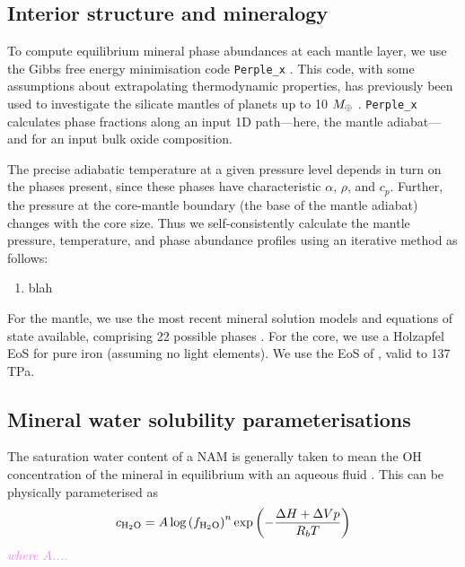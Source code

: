 \documentclass[linenumbers]{aastex631}
\newcommand{\todo}[1]{\textit{\textcolor{violet}{{#1}}}}
\begin{document}
\subsection{Interior structure and mineralogy}

To compute equilibrium mineral phase abundances at each mantle layer, we use the Gibbs free energy minimisation code {\tt Perple\_x} %
\citep{connolly_geodynamic_2009}. This code, with some assumptions about extrapolating thermodynamic properties, has previously been used to investigate the silicate mantles of planets up to 10 $M_\oplus$ \citep{dorn_can_2015, dorn_generalized_2017, dorn_new_2019, unterborn_effects_2017, otegi_impact_2020}. {\tt Perple\_x} calculates phase fractions along an input 1D path---here, the mantle adiabat---and for an input bulk oxide composition. 

The precise adiabatic temperature at a given pressure level depends in turn on the phases present, since these phases have characteristic $\alpha$, $\rho$, and $c_p$. Further, the pressure at the core-mantle boundary (the base of the mantle adiabat) changes with the core size. Thus we self-consistently calculate the mantle pressure, temperature, and phase abundance profiles using an iterative method as follows:

\begin{enumerate}
    \item blah
\end{enumerate}

For the mantle, we use the most recent mineral solution models and equations of state available, comprising 22 possible phases \citep{stixrude_thermal_2022}. For the core, we use a Holzapfel EoS for pure iron (assuming no light elements). We use the EoS of \citet{hakim_new_2018}, valid to 137 TPa.


\subsection{Mineral water solubility parameterisations}

The saturation water content of a NAM is generally taken to mean the OH concentration of the mineral in equilibrium with an aqueous fluid \citep{keppler_thermodynamics_2006}.
This can be physically parameterised as
\begin{equation}
    c_{\rm H_2O} = A  \log \left(f_{\rm H_2O}\right)^n \exp\left(-\frac{\Delta H + \Delta V p}{R_b T}\right)
\label{eq:c_h2o}
\end{equation}
\todo{where $A$....}
\end{document}

